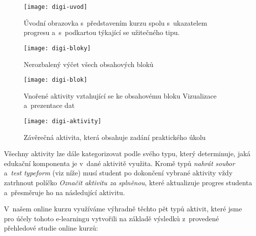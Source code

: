 \begin{figure}[hb!]   
    \centering
    \texttt{[image: digi-uvod]}  
    \caption{Úvodní obrazovka s~představením kurzu spolu s~ukazatelem progresu a~s~podkartou týkající se užitečného tipu.}
    \label{digi-uvod}
\end{figure}

\begin{figure}[hb!]   
    \centering
    \texttt{[image: digi-bloky]}  
    \caption{Nerozbalený výčet všech obsahových bloků}
    \label{digi-bloky}
\end{figure}

\begin{figure}[hb!]   
    \centering
    \texttt{[image: digi-blok]}  
    \caption{Vnořené aktivity vztahující se ke obsahovému bloku Vizualizace a~prezentace dat}
    \label{digi-blok}
\end{figure}

\begin{figure}[hb!]   
    \centering
    \texttt{[image: digi-aktivity]}  
    \caption{Závěrečná aktivita, která obsahuje zadání praktického úkolu}
    \label{digi-aktivity}
\end{figure}

Všechny aktivity lze dále kategorizovat podle svého typu, který determinuje, jaká edukační komponenta je v~dané aktivitě využita. Kromě typů \emph{nahrát soubor} a~\emph{test typeform} (viz níže) musí student po dokončení vybrané aktivity vždy zatrhnout políčko \emph{Označit aktivitu za splněnou}, které aktualizuje progres studenta a~přesměruje ho na následující aktivitu.

V~našem online kurzu využíváme výhradně těchto pět typů aktivit, které jsme pro účely tohoto e-learningu vytvořili na základě výsledků z~provedené přehledové studie online kurzů:

